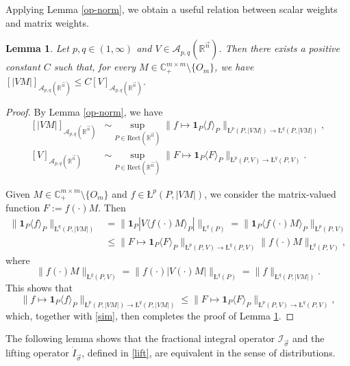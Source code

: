 \documentclass[11pt, reqno]{amsart}
\newtheorem{lemma}[theorem]{Lemma}
\theoremstyle{definition}
\theoremstyle{remark}
\numberwithin{equation}{section}
\newcommand{\A}{\mathscr A}
\newcommand{\C}{\mathbb C}
\newcommand{\R}{\mathbb R}
\newcommand{\vn}{\vec n}
\newcommand{\one}{\mathbf{1}}
\newcommand{\Pdm}{\C_+^{m\times m}}
\newcommand{\ave}[1]{\langle #1\rangle}
\newcommand{\aveL}{\textit{\L}}
\newcommand{\abs}[1]{|#1|}
\newcommand{\Norm}[2]{\|#1\|_{#2}}
\newcommand{\bNorm}[2]{\big\|#1\big\|_{#2}}
\newcommand{\Rect}{\mathrm{Rect}}
\begin{document}
Applying Lemma \ref{op-norm}, we obtain
a useful relation between scalar weights and matrix weights.

\begin{lemma} \label{scalar}
Let $p,q\in(1,\infty)$ and $V\in \A_{p,q}(\R^{\vn})$.
Then there exists a positive constant $C$ such that,
for every $M\in \Pdm\setminus\{O_m\}$, we have
$[|VM|]_{\A_{p,q}(\R^{\vn})}\leq C [V]_{\A_{p,q}(\R^{\vn})}$.
\end{lemma}

\begin{proof}
By Lemma \ref{op-norm}, we have
\begin{equation} \label{sim}
\begin{split}
[\abs{VM}]_{\A_{p,q}(\R^{\vn})}
&\sim \sup_{P\in\Rect(\R^{\vn})}\Norm{f\mapsto\one_P\ave{f}_P}{\aveL^p(P,\abs{VM})\to \aveL^q(P,\abs{VM})}, \\
[V]_{\A_{p,q}(\R^{\vn})}
&\sim \sup_{P\in\Rect(\R^{\vn})}\Norm{F\mapsto\one_P\ave{F}_P}{\aveL^p(P,V)\to \aveL^q(P,V)}.
\end{split}
\end{equation}

Given $M\in \Pdm\setminus\{O_m\}$ and $f\in\aveL^p(P,\abs{VM})$,
we consider the matrix-valued function $F:=f(\cdot) M$. Then
\begin{equation*}
\begin{split}
\Norm{\one_P\ave{f}_P}{\aveL^q(P,\abs{VM})}
&=\bNorm{\one_P\abs{V\ave{f(\cdot) M}_P}}{\aveL^q(P)}
=\Norm{\one_P\ave{f(\cdot)M}_P}{\aveL^p(P,V)} \\
&\leq\Norm{F\mapsto \one_P\ave{F}_P}{\aveL^p(P,V)\to\aveL^q(P,V)}
\Norm{f(\cdot)M}{\aveL^q(P,V)},
\end{split}
\end{equation*}
where
\begin{equation*}
\Norm{f(\cdot)M}{\aveL^q(P,V)}
=\bNorm{f(\cdot)\abs{V(\cdot)M}}{\aveL^q(P)}
=\Norm{f}{\aveL^q(P,\abs{VM})}.
\end{equation*}
This shows that
\begin{equation*}
\Norm{f\mapsto\one_P\ave{f}_P}{\aveL^p(P,\abs{VM})\to \aveL^q(P,\abs{VM})}
\leq\Norm{F\mapsto\one_P\ave{F}_P}{\aveL^p(P,V)\to \aveL^q(P,V)},
\end{equation*}
which, together with \eqref{sim}, then completes the proof of Lemma \ref{scalar}.
\end{proof}

The following lemma shows that the fractional integral operator $\mathscr I_{\vec\sigma}$
and the lifting operator $\dot I_{\vec\sigma}$, defined in \eqref{lift},
are equivalent in the sense of distributions.
\end{document}
